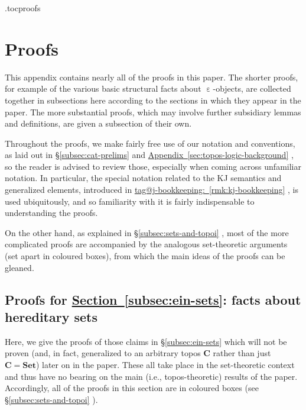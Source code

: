 \documentclass{amsart}
\makeatletter
\newcommand\alttext{\texorpdfstring}
\newcommand\bC{\mathbf{C}}
\newcommand\ein{\mathrel{\varepsilon}}
\newcommand\Set{\mathbf{Set}}
\newcommand\unein{{\ein}}
\newcommand\tagword[1]{\csname tag@#1\endcsname}
\def\label@tag#1:#2\@nil{#1}
\newcommand\labeltag[1]{\label@tag#1:\@nil}
\newcommand\jref[1]{%
  \texorpdfstring%
    {\hyperref[#1]{\tagword{\labeltag{#1}}~\ref*{#1}}}%
    {\tagword{\labeltag{#1}}~\ref*{#1}}%
}
\newcommand\prerefpost[3]{%
  \texorpdfstring%
    {\hyperref[#2]{#1\ref*{#2}#3}}%
    {#1\ref*{#2}#3}%
}
\newcommand\sref[1]{\prerefpost{\S}{#1}{}}
\newcommand\aref[1]{\prerefpost{Appendix~}{#1}{}}
\theoremstyle{definition}
\theoremstyle{remark}
\theoremstyle{plainwithref}
\makeatother
\begin{document}
\clearpage

\etocdepthtag.toc{proofs}
\section{Proofs} \label{sec:proofs}
This appendix contains nearly all of the proofs in this paper.
The shorter proofs, for example of the various basic structural facts about \( \unein \)-objects, are collected together in subsections here according to the sections in which they appear in the paper.
The more substantial proofs, which may involve further subsidiary lemmas and definitions, are given a subsection of their own.

Throughout the proofs, we make fairly free use of our notation and conventions, as laid out in \sref{subsec:cat-prelims} and \aref{sec:topos-logic-background}, so the reader is advised to review those, especially when coming across unfamiliar notation.
In particular, the special notation related to the KJ semantics and generalized elements, introduced in \jref{rmk:kj-bookkeeping}, is used ubiquitously, and so familiarity with it is fairly indispensable to understanding the proofs.

On the other hand, as explained in \sref{subsec:sets-and-topoi}, most of the more complicated proofs are accompanied by the analogous set-theoretic arguments (set apart in coloured boxes), from which the main ideas of the proofs can be gleaned.
\vspace{1cm}

{
\renewcommand\hyperref[2][]{#2}
\localtableofcontents
}

\subsection{Proofs for \alttext{\hyperref[subsec:ein-sets]{Section~\ref*{subsec:ein-sets}}}{Section~\ref*{subsec:ein-sets}}: facts about hereditary sets} \label{subsec:ein-sets-proofs}
Here, we give the proofs of those claims in \sref{subsec:ein-sets} which will not be proven (and, in fact, generalized to an arbitrary topos \( \bC \) rather than just \( \bC = \Set \)) later on in the paper.
These all take place in the set-theoretic context and thus have no bearing on the main (i.e., topos-theoretic) results of the paper.
Accordingly, all of the proofs in this section are in coloured boxes (see \sref{subsec:sets-and-topoi}).
\end{document}
